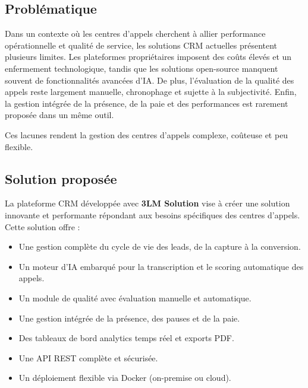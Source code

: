 \subsection{Problématique}

Dans un contexte où les centres d'appels cherchent à allier performance opérationnelle et
qualité de service, les solutions CRM actuelles présentent plusieurs limites. Les plateformes
propriétaires imposent des coûts élevés et un enfermement technologique, tandis que les
solutions open-source manquent souvent de fonctionnalités avancées d'IA. De plus, l'évaluation
de la qualité des appels reste largement manuelle, chronophage et sujette à la subjectivité.
Enfin, la gestion intégrée de la présence, de la paie et des performances est rarement
proposée dans un même outil.

Ces lacunes rendent la gestion des centres d'appels complexe, coûteuse et peu flexible.

\subsection{Solution proposée}

La plateforme CRM développée avec \textbf{3LM Solution} vise à créer une solution innovante et
performante répondant aux besoins spécifiques des centres d'appels. Cette solution offre :

\begin{itemize}
    \item Une gestion complète du cycle de vie des leads, de la capture à la conversion.
    \item Un moteur d'IA embarqué pour la transcription et le scoring automatique des appels.
    \item Un module de qualité avec évaluation manuelle et automatique.
    \item Une gestion intégrée de la présence, des pauses et de la paie.
    \item Des tableaux de bord analytics temps réel et exports PDF.
    \item Une API REST complète et sécurisée.
    \item Un déploiement flexible via Docker (on-premise ou cloud).
\end{itemize}

